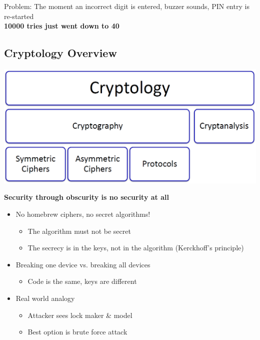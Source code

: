 Problem: The moment an incorrect digit is entered, buzzer sounds, PIN entry is re-started\\
\textbf{10000 tries just went down to 40}

\subsection{Cryptology Overview}
\includegraphics[width=0.5\linewidth]{images/EmbeddedSecurity/cryptologyOverview}

\textbf{Security through obscurity is no security at all}
\begin{itemize}
  \item No homebrew ciphers, no secret algorithms!
  \begin{itemize}
    \item The algorithm must not be secret
    \item The secrecy is in the keys, not in the algorithm (Kerckhoff's principle)
  \end{itemize}
  \item Breaking one device vs. breaking all devices
  \begin{itemize}
    \item Code is the same, keys are different
  \end{itemize}
  \item Real world analogy
  \begin{itemize}
    \item Attacker sees lock maker \& model
    \item Best option is brute force attack
  \end{itemize}
\end{itemize}

